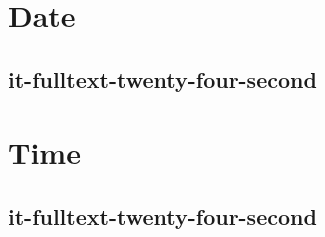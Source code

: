 \documentclass[italian]{article}
\begin{document}
	\section{Date}
	\subsection{it-fulltext-twenty-four-second}
	
	\section{Time}
	\subsection{it-fulltext-twenty-four-second}
	
\end{document}
